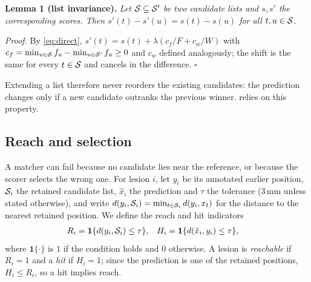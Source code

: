 \noindent\textbf{Lemma 1 (list invariance).} \emph{Let $\mathcal{S} \subseteq \mathcal{S}'$ be two candidate lists and $s, s'$ the corresponding scores. Then $s'(t) - s'(u) = s(t) - s(u)$ for all $t, u \in \mathcal{S}$.}

\noindent\emph{Proof.}
By \cref{eq:direct}, $s'(t) = s(t) + \lambda (c_f/F + c_w/W)$ with $c_f = \min_{u\in\mathcal{S}} f_u - \min_{u\in\mathcal{S}'} f_u \ge 0$ and $c_w$ defined analogously; the shift is the same for every $t \in \mathcal{S}$ and cancels in the difference. \hfill$\square$

\noindent Extending a list therefore never reorders the existing candidates: the prediction changes only if a new candidate outranks the previous winner.
 relies on this property.

\subsection{Reach and selection}
\label{sec:decomp}
A matcher can fail because no candidate lies near the reference, or because the scorer selects the wrong one.
For lesion $i$, let $y_i$ be its annotated earlier position, $\mathcal{S}_i$ the retained candidate list, $\hat x_i$ the prediction and $\tau$ the tolerance (3\,mm unless stated otherwise), and write $d(y_i, \mathcal{S}_i) = \min_{t\in\mathcal{S}_i} d(y_i, x_t)$ for the distance to the nearest retained position.
We define the reach and hit indicators
\begin{align}
R_i &= \mathbf{1}\{d(y_i, \mathcal{S}_i) \le \tau\}, &
H_i &= \mathbf{1}\{d(\hat{x}_i, y_i) \le \tau\},
\label{eq:reachhit}
\end{align}
where $\mathbf{1}\{\cdot\}$ is $1$ if the condition holds and $0$ otherwise.
A lesion is \emph{reachable} if $R_i = 1$ and a \emph{hit} if $H_i = 1$; since the prediction is one of the retained positions, $H_i \le R_i$, so a hit implies reach.

